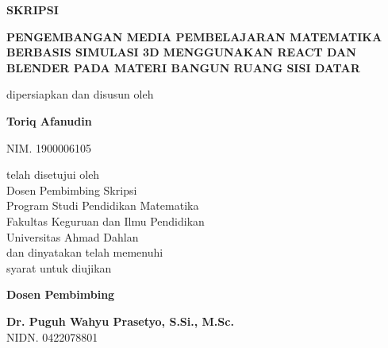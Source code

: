 \newpage
\thispagestyle{empty}

\begin{center}
    {
        \fontsize{16pt}{18pt}\selectfont
        \textbf{SKRIPSI}
    }
    
    \vspace{0.4cm}
    
    {
        \fontsize{14pt}{16pt}\selectfont
        \textbf{PENGEMBANGAN MEDIA PEMBELAJARAN MATEMATIKA BERBASIS SIMULASI 3D MENGGUNAKAN REACT DAN BLENDER PADA MATERI BANGUN RUANG SISI DATAR}
    }
    
    \vspace{0.5cm}
    
    {\fontsize{12pt}{14pt}\selectfont
        dipersiapkan dan disusun oleh}
    
    \vspace{0.3cm}
    
    {\fontsize{14pt}{16pt}\selectfont
        \textbf{Toriq Afanudin}}
    
    \vspace{0.2cm}
    
    {\fontsize{12pt}{14pt}\selectfont
        NIM. 1900006105}
    
    \vspace{0.5cm}
    
    {\fontsize{12pt}{14pt}\selectfont
        telah disetujui oleh\\
        Dosen Pembimbing Skripsi\\
        Program Studi Pendidikan Matematika\\
        Fakultas Keguruan dan Ilmu Pendidikan\\
        Universitas Ahmad Dahlan\\
        dan dinyatakan telah memenuhi\\
        syarat untuk diujikan}
    
    \vspace{0.8cm}
    
    {\fontsize{14pt}{16pt}\selectfont
        \textbf{Dosen Pembimbing}}
    
    \vspace{1.5cm}
    
    {\fontsize{12pt}{14pt}\selectfont
        \textbf{Dr. Puguh Wahyu Prasetyo, S.Si., M.Sc.} \\
        NIDN. 0422078801
    }
\end{center}